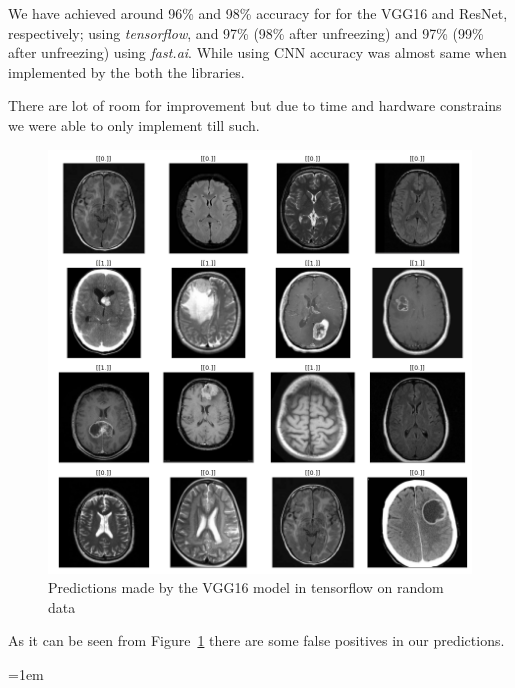 \documentclass[11pt]{article}
\begin{document}
	We have achieved around 96\% and 98\% accuracy for for the VGG16 and ResNet,
	respectively; using \textit{tensorflow}, and 97\% (98\% after unfreezing)
	and 97\% (99\% after unfreezing) using \textit{fast.ai}. While using CNN
	accuracy was almost same when implemented by the both the libraries.

	There are lot of room for improvement but due to time and hardware
	constrains we were able to only implement till such.

	\begin{figure}[ht]
		\centering
		\includegraphics[width=\linewidth]{imgs/result.png}
		\caption{Predictions made by the VGG16 model in tensorflow on random data}%
		\label{fig:result}
	\end{figure}

	As it can be seen from Figure~\ref{fig:result} there are some false
	positives in our predictions.

	\emergencystretch=1em
	\printbibliography[heading=bibintoc,title={References}]
\end{document}
